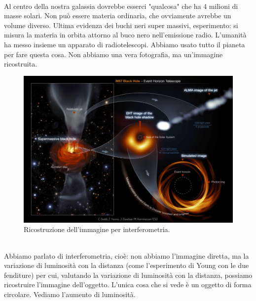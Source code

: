 \documentclass[a4paper,11pt]{article}
\begin{document}
    \\
Al centro della nostra galassia dovrebbe esserci "qualcosa" che ha 4 milioni di masse solari. Non può essere materia ordinaria, che ovviamente avrebbe un volume diverso. Ultima evidenza dei buchi neri super massivi, esperimento: si misura la materia in orbita attorno al buco nero nell'emissione radio. L'umanità ha messo insieme un apparato di radiotelescopi. Abbiamo usato tutto il pianeta per fare questa cosa. Non abbiamo una vera fotografia, ma un'immagine ricostruita. 
\begin{figure}[h!!]
        \centering
        \includegraphics[width=12cm]{lezione 28 novembre/immaginericostruita.png}
        \caption{Ricostruzione dell'immagine per interferometria.}
        \label{lezione 28 novembre/immaginericostruita.png}
    \end{figure}
    \\
Abbiamo parlato di interferometria, cioè: non abbiamo l'immagine diretta, ma la variazione di luminosità con la distanza (come l'esperimento di Young con le due fenditure) per cui, valutando la variazione di luminosità con la distanza, possiamo ricostruire l'immagine dell'oggetto. L'unica cosa che si vede è un oggetto di forma circolare. Vediamo l'aumento di luminosità. 
\newpage
\end{document}
